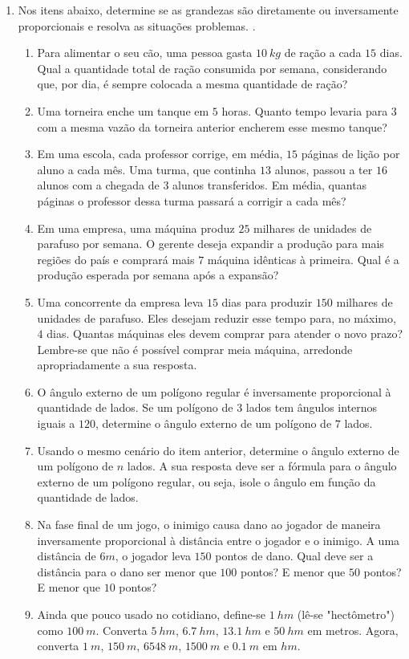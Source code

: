 \documentclass[12pt]{report}
\newcommand{\1}{\faThermometerEmpty}
\newcommand{\2}{\faThermometerQuarter}
\newcommand{\3}{\faThermometerHalf}
\newcommand{\4}{\faThermometerThreeQuarters}
\newcommand{\5}{\faThermometerFull}
\begin{document}
\begin{enumerate}
\item Nos itens abaixo, determine se as grandezas são diretamente ou inversamente proporcionais e resolva as situações problemas. \1.
\begin{enumerate}
\item Para alimentar o seu cão, uma pessoa gasta $10\ kg$ de ração a cada $15$ dias. Qual a quantidade total de ração consumida por semana, considerando que, por dia, é sempre colocada a mesma quantidade de ração?  
\item Uma torneira enche um tanque em $5$ horas. Quanto tempo levaria para $3$ com a mesma vazão da torneira anterior  encherem esse mesmo tanque?
\item Em uma escola, cada professor corrige, em média, $15$ páginas de lição por aluno a cada mês. Uma turma, que continha $13$ alunos, passou a ter $16$ alunos com a chegada de $3$ alunos transferidos. Em média, quantas páginas o professor dessa turma passará a corrigir a cada mês?
\item Em uma empresa, uma máquina produz $25$ milhares de unidades de parafuso por semana. O gerente deseja expandir a produção para mais regiões do país e comprará mais $7$ máquina idênticas à primeira. Qual é a produção esperada por semana após a expansão?
\item Uma concorrente da empresa leva $15$ dias para produzir $150$ milhares de unidades de parafuso. Eles desejam reduzir esse tempo para, no máximo, $4$ dias. Quantas máquinas eles devem comprar para atender o novo prazo? Lembre-se que não é possível comprar meia máquina, arredonde apropriadamente a sua resposta.
\item O ângulo externo de um polígono regular é inversamente proporcional à quantidade de lados. Se um polígono de $3$ lados tem ângulos internos iguais a $120 $\textdegree, determine o ângulo externo de um polígono de $7$ lados.
\item \2 Usando o mesmo cenário do item anterior, determine o ângulo externo de um polígono de $n$ lados. A sua resposta deve ser a fórmula para o ângulo externo de um polígono regular, ou seja, isole o ângulo em função da quantidade de lados.
\item Na fase final de um jogo, o inimigo causa dano ao jogador de maneira inversamente proporcional à distância entre o jogador e o inimigo. A uma distância de $6m$, o jogador leva $150$ pontos de dano. Qual deve ser a distância para o dano ser menor que $100$ pontos? E menor que $50$ pontos? E menor que $10$ pontos?
\item Ainda que pouco usado no cotidiano, define-se $1\ hm$ (lê-se "hectômetro") como $100\ m$. Converta $5\ hm$, $6.7\ hm$, $13.1\ hm$ e $50\ hm$ em metros. Agora, converta $1\ m$, $150\ m$, $6548\ m$, $1500\ m$ e $0.1\ m$ em $hm$.

\end{enumerate}
\end{enumerate}
\end{document}
